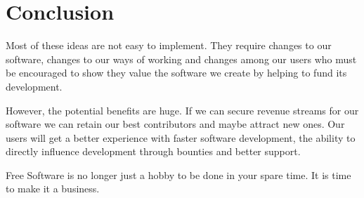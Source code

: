 \section*{Conclusion}

Most of these ideas are not easy to implement. They require changes to our
software, changes to our ways of working and changes among our users who must be
encouraged to show they value the software we create by helping to fund its
development.

However, the potential benefits are huge. If we can secure revenue streams for
our software we can retain our best contributors and maybe attract new ones. Our
users will get a better experience with faster software development, the ability
to directly influence development through bounties and better support.

Free Software is no longer just a hobby to be done in your spare time. It is
time to make it a business.
